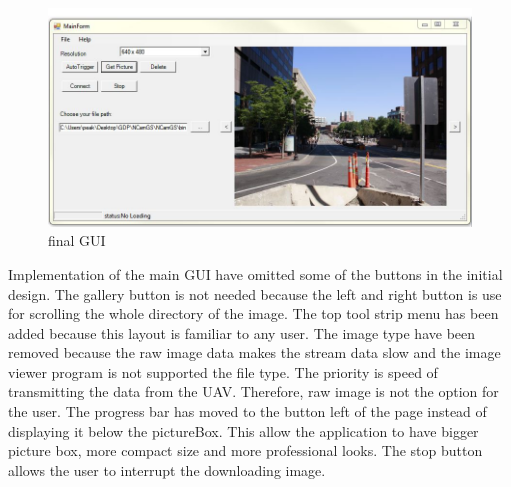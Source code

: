 \documentclass[oneside]{ecsgdp}         %
\begin{document}
\begin{figure}[!hbtp]
\begin{center}
\includegraphics[scale=0.5]{finalGUI.png} 
\end{center}
\caption{final GUI\label{finalGUI}}
\end{figure}
Implementation of the main GUI have omitted some of the buttons in the initial design. The gallery button is not needed because the left and right button is use for scrolling the whole directory of the image. The top tool strip menu has been added because this layout is familiar to any user. The image type have been removed because the raw image data makes the stream data slow and the image viewer program is not supported the file type. The priority is speed of transmitting the data from the UAV. Therefore, raw image is not the option for the user. The progress bar has moved to the button left of the page instead of displaying it below the pictureBox.
This allow the application to have bigger picture box, more compact size and more professional looks.
The stop button allows the user to interrupt the downloading image.
\end{document}
